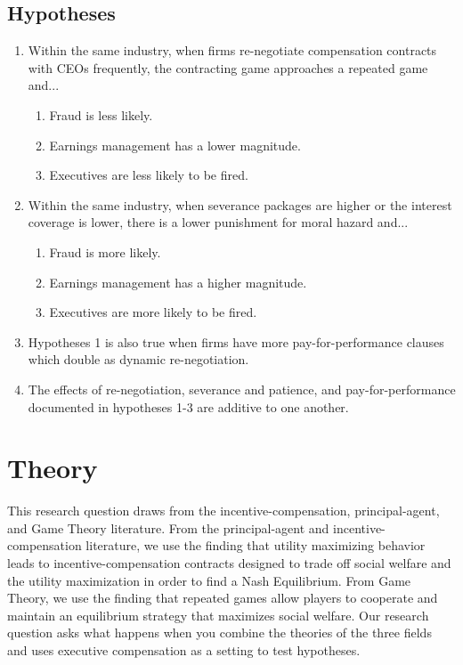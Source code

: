\documentclass{article}
\begin{document}
\subsection{Hypotheses}
\begin{enumerate}
	\item Within the same industry, when firms re-negotiate compensation contracts with CEOs frequently, the contracting game approaches a repeated game and...
	\begin{enumerate}
		\item Fraud is less likely.
		\item Earnings management has a lower magnitude.
		\item Executives are less likely to be fired.
	\end{enumerate}
	\item Within the same industry, when severance packages are higher or the interest coverage is lower, there is a lower punishment for moral hazard and...
	\begin{enumerate}
		\item Fraud is more likely.
		\item Earnings management has a higher magnitude.
		\item Executives are more likely to be fired.
	\end{enumerate}
	\item Hypotheses 1 is also true when firms have more pay-for-performance clauses which double as dynamic re-negotiation.
	\item The effects of re-negotiation, severance and patience, and pay-for-performance documented in hypotheses 1-3 are additive to one another.
\end{enumerate}

\section{Theory}
This research question draws from the incentive-compensation, principal-agent, and Game Theory literature. From the principal-agent and incentive-compensation literature, we use the finding that utility maximizing behavior leads to incentive-compensation contracts designed to trade off social welfare and the utility maximization in order to find a Nash Equilibrium. From Game Theory, we use the finding that repeated games allow players to cooperate and maintain an equilibrium strategy that maximizes social welfare. Our research question asks what happens when you combine the theories of the three fields and uses executive compensation as a setting to test hypotheses.
\end{document}
